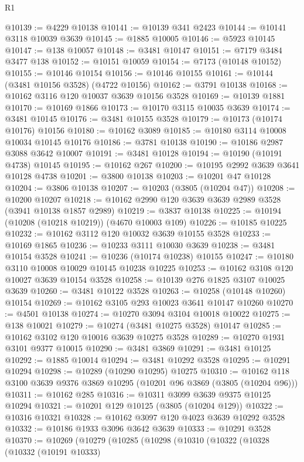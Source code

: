 \begin{lexlean}{R1}
\begin{coremodule}
@10139 := @4229 @10138
@10141 := @10139 @341 @2423
@10144 := @10141 @3118 @10039 @3639
@10145 := @1885 @10005
@10146 := @5923 @10145
@10147 := @138 @10057
@10148 := @3481 @10147
@10151 := @7179 @3484 @3477 @138
@10152 := @10151 @10059
@10154 := @7173 (@10148 @10152)
@10155 := @10146 @10154
@10156 := @10146 @10155
@10161 := @10144 (@3481 @10156 @3528) (@4722 @10156)
@10162 := @3791 @10138
@10168 := @10162 @3116 @120 @10037 @3639 @10156 @3528
@10169 := @10139 @1881
@10170 := @10169 @1866
@10173 := @10170 @3115 @10035 @3639
@10174 := @3481 @10145
@10176 := @3481 @10155 @3528
@10179 := @10173 (@10174 @10176) @10156
@10180 := @10162 @3089
@10185 := @10180 @3114 @10008 @10034 @10145 @10176
@10186 := @3781 @10138
@10190 := @10186 @2987 @3088 @3642 @10007
@10191 := @3481 @10128
@10194 := @10190 (@10191 @4738) @10145
@10195 := @10162 @267
@10200 := @10195 @2992 @3639 @3641 @10128 @4738
@10201 := @3800 @10138
@10203 := @10201 @47 @10128
@10204 := @3806 @10138
@10207 := @10203 (@3805 (@10204 @47))
@10208 := @10200 @10207
@10218 := @10162 @2990 @120 @3639 @3639 @2989 @3528 (@3941 @10138 @1857 @2989)
@10219 := @3837 @10138
@10225 := @10194 (@10208 (@10218 @10219)) (@4670 @10003 @109)
@10226 := @10185 @10225
@10232 := @10162 @3112 @120 @10032 @3639 @10155 @3528
@10233 := @10169 @1865
@10236 := @10233 @3111 @10030 @3639
@10238 := @3481 @10154 @3528
@10241 := @10236 (@10174 @10238) @10155
@10247 := @10180 @3110 @10008 @10029 @10145 @10238 @10225
@10253 := @10162 @3108 @120 @10027 @3639 @10154 @3528
@10258 := @10139 @276 @1825 @3107 @10025 @3639
@10260 := @3481 @10122 @3528
@10263 := @10258 (@10148 @10260) @10154
@10269 := @10162 @3105 @293 @10023 @3641 @10147 @10260
@10270 := @4501 @10138
@10274 := @10270 @3094 @3104 @10018 @10022
@10275 := @138 @10021
@10279 := @10274 (@3481 @10275 @3528) @10147
@10285 := @10162 @3102 @120 @10016 @3639 @10275 @3528
@10289 := @10270 @1931 @3101 @9377 @10015
@10290 := @3481 @3869
@10291 := @3481 @10125
@10292 := @1885 @10014
@10294 := @3481 @10292 @3528
@10295 := @10291 @10294
@10298 := @10289 (@10290 @10295) @10275
@10310 := @10162 @118 @3100 @3639 @9376 @3869 @10295 (@10201 @96 @3869 (@3805 (@10204 @96)))
@10311 := @10162 @285
@10316 := @10311 @3099 @3639 @9375 @10125 @10294
@10321 := @10201 @129 @10125 (@3805 (@10204 @129))
@10322 := @10316 @10321
@10328 := @10162 @3097 @120 @4023 @3639 @10292 @3528
@10332 := @10186 @1933 @3096 @3642 @3639
@10333 := @10291 @3528
@10370 := @10269
    (@10279
      (@10285
        (@10298
          (@10310
            (@10322
              (@10328
                (@10332
                  (@10191 @10333)

\end{coremodule}
\end{lexlean}
